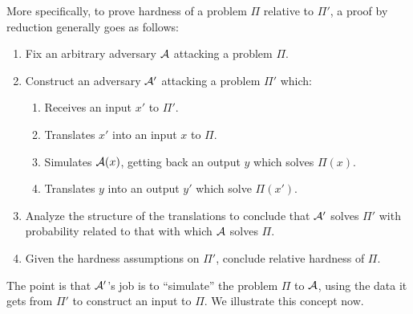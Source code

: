More specifically, to prove hardness of a problem $\Pi$ relative to $\Pi'$, a
proof by reduction generally goes as follows:
\begin{enumerate}
  \item Fix an arbitrary adversary $\mathcal{A}$ attacking a problem $\Pi$.
  \item Construct an adversary $\mathcal{A}'$ attacking a problem $\Pi'$ which:
    \begin{enumerate}
      \item Receives an input $x'$ to $\Pi'$.
      \item Translates $x'$ into an input $x$ to $\Pi$.
      \item Simulates $\mathcal{A}(x)$, getting back an output $y$ which solves
        $\Pi(x)$.
      \item Translates $y$ into an output $y'$ which solve $\Pi(x')$.
    \end{enumerate}
  \item Analyze the structure of the translations to conclude that $\mathcal{A}'$ solves
    $\Pi'$ with probability related to that with which $\mathcal{A}$ solves $\Pi$.
  \item Given the hardness assumptions on $\Pi'$, conclude relative hardness of
    $\Pi$.
\end{enumerate}

The point is that $\mathcal{A}'$'s job is to ``simulate'' the problem $\Pi$ to $\mathcal{A}$,
using the data it gets from $\Pi'$ to construct an input to $\Pi$. We illustrate
this concept now.

